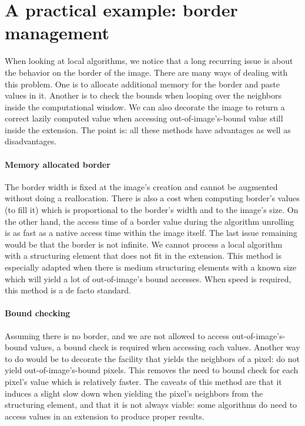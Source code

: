 \section{A practical example: border management}

\label{sec:border.management}

When looking at local algorithms, we notice that a long recurring issue is about the behavior on the border of the
image. There are many ways of dealing with this problem. One is to allocate additional memory for the border and paste
values in it. Another is to check the bounds when looping over the neighbors inside the computational window. We can
also decorate the image to return a correct lazily computed value when accessing out-of-image's-bound value still inside
the extension. The point is: all these methods have advantages as well as disadvantages.

\paragraph{Memory allocated border}
The border width is fixed at the image's creation and cannot be augmented without doing a reallocation. There is also a
cost when computing border's values (to fill it) which is proportional to the border's width and to the image's size. On
the other hand, the access time of a border value during the algorithm unrolling is as fast as a native access time
within the image itself. The last issue remaining would be that the border is not infinite. We cannot process a local
algorithm with a structuring element that does not fit in the extension. This method is especially adapted when there is
medium structuring elements with a known size which will yield a lot of out-of-image's bound accesses. When speed is
required, this method is a de facto standard.

\paragraph{Bound checking}
Assuming there is no border, and we are not allowed to access out-of-image's-bound values, a bound check is required when
accessing each values. Another way to do would be to decorate the facility that yields the neighbors of a pixel: do not
yield out-of-image's-bound pixels. This removes the need to bound check for each pixel's value which is relatively
faster. The caveats of this method are that it induces a slight slow down when yielding the pixel's neighbors from the
structuring element, and that it is not always viable: some algorithms do need to access values in an extension to
produce proper results.

